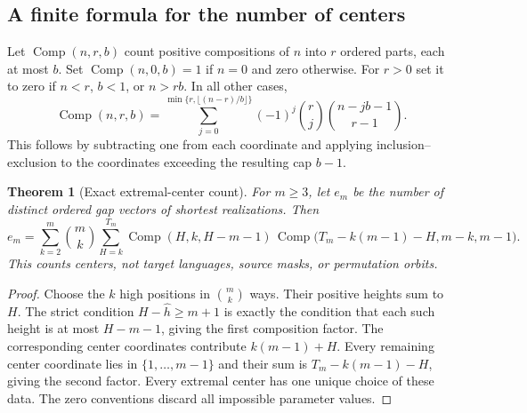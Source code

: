 \documentclass[11pt,letterpaper]{article}
\newtheorem{theorem}{Theorem}[section]
\theoremstyle{definition}\newtheorem{definition}[theorem]{Definition}
\theoremstyle{remark}\newtheorem{remark}[theorem]{Remark}
\theoremstyle{definition}\newtheorem{question}[theorem]{Question}
\begin{document}
\subsection{A finite formula for the number of centers}
Let $\operatorname{Comp}(n,r,b)$ count positive compositions of $n$ into $r$ ordered parts,
each at most $b$. Set $\operatorname{Comp}(n,0,b)=1$ if $n=0$ and zero otherwise. For $r>0$
set it to zero if $n<r$, $b<1$, or $n>rb$. In all other cases,
\begin{equation}\label{ids:si:eq:boundedcomp}
 \operatorname{Comp}(n,r,b)=\sum_{j=0}^{\min\{r,\lfloor(n-r)/b\rfloor\}}
       (-1)^j\binom rj\binom{n-jb-1}{r-1}.
\end{equation}
This follows by subtracting one from each coordinate and applying
inclusion--exclusion to the coordinates exceeding the resulting cap $b-1$.

\begin{theorem}[Exact extremal-center count]\label{ids:si:thm:count}
For $m\geq3$, let $e_m$ be the number of distinct ordered gap vectors of
shortest realizations. Then
\begin{equation}\label{ids:si:eq:center-count}
 e_m=\sum_{k=2}^{m}\binom mk\sum_{H=k}^{T_m}
 \operatorname{Comp}(H,k,H-m-1)\,
 \operatorname{Comp}\bigl(T_m-k(m-1)-H,m-k,m-1\bigr).
\end{equation}
This counts centers, not target languages, source masks, or permutation
orbits.
\end{theorem}
\begin{proof}
Choose the $k$ high positions in $\binom mk$ ways. Their positive heights
sum to $H$. The strict condition $H-\hat h\geq m+1$ is exactly the condition
that each such height is at most $H-m-1$, giving the first composition
factor. The corresponding center coordinates contribute $k(m-1)+H$.
Every remaining center coordinate lies in $\{1,\ldots,m-1\}$ and their
sum is $T_m-k(m-1)-H$, giving the second factor. Every extremal center has
one unique choice of these data. The zero conventions discard all
impossible parameter values.
\end{proof}
\end{document}

